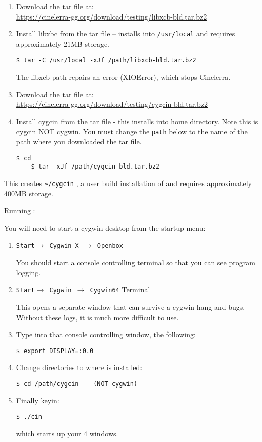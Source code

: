 \begin{enumerate}
	\item Download the tar file at:\\
	 {\small \url{https://cinelerra-gg.org/download/testing/libxcb-bld.tar.bz2}}
	\item Install libxbc from the tar file -- installs into \texttt{/usr/local} and requires approximately 21MB storage.
\begin{lstlisting}[style=sh]
	$ tar -C /usr/local -xJf /path/libxcb-bld.tar.bz2
\end{lstlisting}
The libxcb path repairs an error (XIOError), which stops Cinelerra.
	\item Download the tar file at:\\
	{\small \url{https://cinelerra-gg.org/download/testing/cygcin-bld.tar.bz2}}	
	\item Install cygcin from the tar file - this installs into home directory.  Note this is cygcin NOT cygwin. You must change the \texttt{path} below to the name of the path where you downloaded the tar file.
\begin{lstlisting}[style=sh]
	$ cd
	$ tar -xJf /path/cygcin-bld.tar.bz2
\end{lstlisting}
\end{enumerate}
This creates \texttt{\~{}/cygcin} , a user build installation of \CGG{} and requires approximately 400MB storage.

\underline{Running \CGG{}:}

You will need to start a cygwin desktop from the startup menu:
\begin{enumerate}
	\item \texttt{Start$\rightarrow$ Cygwin-X $\rightarrow$ Openbox}

You should start a console controlling terminal so that you can see program logging.
	\item \texttt{Start$\rightarrow$ Cygwin $\rightarrow$ Cygwin64} Terminal

This opens a separate window that can survive a cygwin hang and bugs. Without these logs, it is much more difficult to use.

	\item Type into that console controlling window, the following:
\begin{lstlisting}[style=sh]
	$ export DISPLAY=:0.0
\end{lstlisting}
	\item Change directories to where \CGG{} is installed:
\begin{lstlisting}[style=sh]
	$ cd /path/cygcin    (NOT cygwin)
\end{lstlisting}
	\item Finally keyin:
\begin{lstlisting}[style=sh]
	$ ./cin
\end{lstlisting}
which starts up your 4 \CGG{} windows.
\end{enumerate}


